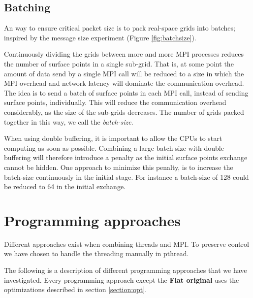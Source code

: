 \documentclass[preprint,3p,times,twocolumn]{elsarticle}
\begin{document}
\subsection{Batching}
An way to ensure critical packet size is to pack real-space grids into batches; inspired by the message size experiment (Figure \ref{fig:batchsize}).

Continuously dividing the grids between more and more MPI processes reduces the number of surface points in a single sub-grid. That is, at some point the amount of data send by a single MPI call will be reduced to a size in which the MPI overhead and network latency will dominate the communication overhead. The idea is to send a batch of surface points in each MPI call, instead of sending surface points, individually. This will reduce the communication overhead considerably, as the size of the sub-grids decreases. The number of grids packed together in this way, we call the \emph{batch-size}.

When using double buffering, it is important to allow the CPUs to start computing as soon as possible. Combining a large batch-size with double buffering will therefore introduce a penalty as the initial surface points exchange cannot be hidden. One approach to minimize this penalty, is to increase the batch-size continuously in the initial stage. For instance a batch-size of 128 could be reduced to 64 in the initial exchange.

\section{Programming approaches}
Different approaches exist when combining threads and MPI. To preserve control we have chosen to handle the threading manually in pthread.

The following is a description of different programming approaches that we have investigated. Every programming approach except the \textbf{Flat original} uses the optimizations described in section \ref{section:opt}.
\end{document}
